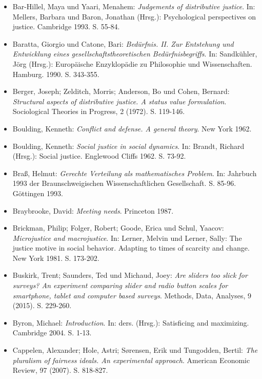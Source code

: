 \documentclass[a4paper]{thesis}
\begin{document}
\begin{itemize}[leftmargin=1.5em,label={},itemindent=-1.5em, itemsep=-1ex]
\item Bar-Hillel, Maya und Yaari, Menahem: \textit{Judgements of distributive justice}. In: Mellers, Barbara und Baron, Jonathan (Hrsg.): Psychological perspectives on justice. Cambridge 1993. S. 55-84.

\item Baratta, Giorgio und Catone, Bari: \textit{Bedürfnis. II. Zur Entstehung und Entwicklung eines gesellschaftstheoretischen Bedürfnisbegriffs}. In: Sandkühler, Jörg (Hrsg.): Europäische Enzyklopädie zu Philosophie und Wissenschaften. Hamburg. 1990. S. 343-355.

\item Berger, Joseph; Zelditch, Morris; Anderson, Bo und Cohen, Bernard: \textit{Structural aspects of distributive justice. A status value formulation}. Sociological Theories in Progress, 2 (1972). S. 119-146.

\item Boulding, Kenneth: \textit{Conflict and defense. A general theory}. New York 1962.

\item Boulding, Kenneth: \textit{Social justice in social dynamics}. In: Brandt, Richard (Hrsg.): Social justice. Englewood Cliffs 1962. S. 73-92.

\item Braß, Helmut: \textit{Gerechte Verteilung als mathematisches Problem}. In: Jahrbuch 1993 der Braunschweigischen Wissenschaftlichen Gesellschaft. S. 85-96. Göttingen 1993.

\item Braybrooke, David: \textit{Meeting needs}. Princeton 1987.

\item Brickman, Philip; Folger, Robert; Goode, Erica und Schul, Yaacov: \textit{Microjustice and macrojustice}. In: Lerner, Melvin und Lerner, Sally: The justice motive in social behavior. Adapting to times of scarcity and change. New York 1981. S. 173-202.

\item Buskirk, Trent; Saunders, Ted und Michaud, Joey: \textit{Are sliders too slick for surveys? An experiment comparing slider and radio button scales for smartphone, tablet and computer based surveys}. Methods, Data, Analyses, 9 (2015). S. 229-260.

\item Byron, Michael: \textit{Introduction}. In: ders. (Hrsg.): Satisficing and maximizing. Cambridge 2004. S. 1-13.

\item Cappelen, Alexander; Hole, Astri; Sørensen, Erik und Tungodden, Bertil: \textit{The pluralism of fairness ideals. An experimental approach}. American Economic Review, 97 (2007). S. 818-827.


\end{itemize}
\end{document}
